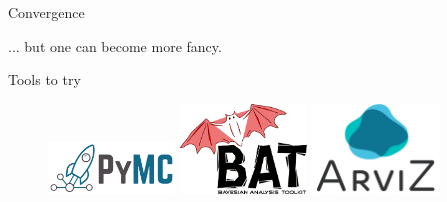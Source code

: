 \documentclass[
aspectratio=169,
14pt,
professionalfonts
]{beamer}
\begin{document}
\begin{frame}{Convergence}
\begin{minipage}[t]{0.49\linewidth}
\begin{figure}
    \end{figure}
    \end{minipage}
    ... but one can become more fancy. %
\end{frame}

\begin{frame}{Tools to try}
\begin{figure}
    \center
    \href{
        https://www.pymc.io/
    }{\includegraphics[width=0.3\textwidth]{../plots/pymc.png}}
    \hfill
    \href{
        https://github.com/bat
    }{\includegraphics[width=0.3\textwidth]{../plots/bat.pdf}}
    \hfill
    \href{
        https://python.arviz.org/en/stable/
    }{\includegraphics[width=0.3\textwidth]{../plots/arviz.png}}
\end{figure}
\end{frame}




\end{document}

